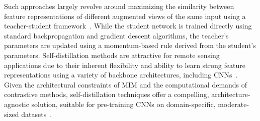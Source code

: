 Such approaches largely revolve around maximizing the similarity between feature representations of different augmented views of the same input using a teacher-student framework~\citep{heFoundationModelBasedMultimodal2024}.
While the student network is trained directly using standard backpropagation and gradient descent algorithms, the teacher's parameters are updated using a momentum-based rule derived from the student's parameters.
Self-distillation methods are attractive for remote sensing applications due to their inherent flexibility and ability to learn strong feature representations using a variety of backbone architectures, including CNNs~\citep{chenExploringSimpleSiamese2020}.
Given the architectural constraints of MIM and the computational demands of contrastive methods, self-distillation techniques offer a compelling, architecture-agnostic solution, suitable for pre-training CNNs on domain-specific, moderate-sized datasets~\citep{jainSelfSupervisedLearningInvariant2022}.


